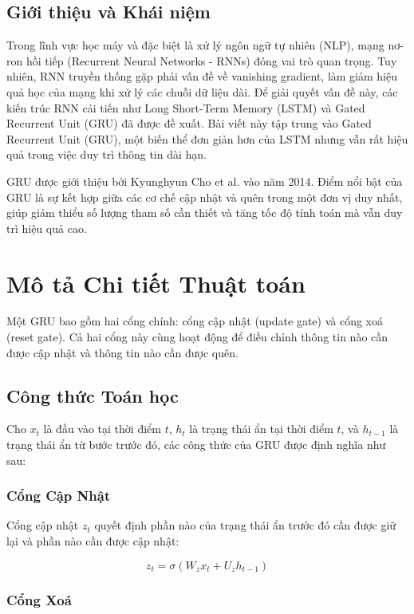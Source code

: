 

\subsection{Giới thiệu và Khái niệm}

Trong lĩnh vực học máy và đặc biệt là xử lý ngôn ngữ tự nhiên (NLP), mạng nơ-ron hồi tiếp (Recurrent Neural Networks - RNNs) đóng vai trò quan trọng. Tuy nhiên, RNN truyền thống gặp phải vấn đề về vanishing gradient, làm giảm hiệu quả học của mạng khi xử lý các chuỗi dữ liệu dài. Để giải quyết vấn đề này, các kiến trúc RNN cải tiến như Long Short-Term Memory (LSTM) và Gated Recurrent Unit (GRU) đã được đề xuất. Bài viết này tập trung vào Gated Recurrent Unit (GRU), một biến thể đơn giản hơn của LSTM nhưng vẫn rất hiệu quả trong việc duy trì thông tin dài hạn.

GRU được giới thiệu bởi Kyunghyun Cho et al. vào năm 2014. Điểm nổi bật của GRU là sự kết hợp giữa các cơ chế cập nhật và quên trong một đơn vị duy nhất, giúp giảm thiểu số lượng tham số cần thiết và tăng tốc độ tính toán mà vẫn duy trì hiệu quả cao.

\section{Mô tả Chi tiết Thuật toán}

Một GRU bao gồm hai cổng chính: cổng cập nhật (update gate) và cổng xoá (reset gate). Cả hai cổng này cùng hoạt động để điều chỉnh thông tin nào cần được cập nhật và thông tin nào cần được quên. 

\subsection{Công thức Toán học}

Cho \( x_t \) là đầu vào tại thời điểm \( t \), \( h_t \) là trạng thái ẩn tại thời điểm \( t \), và \( h_{t-1} \) là trạng thái ẩn từ bước trước đó, các công thức của GRU được định nghĩa như sau:

\subsubsection{Cổng Cập Nhật}

Cổng cập nhật \( z_t \) quyết định phần nào của trạng thái ẩn trước đó cần được giữ lại và phần nào cần được cập nhật:

\[
z_t = \sigma(W_z x_t + U_z h_{t-1})
\]

\subsubsection{Cổng Xoá}

